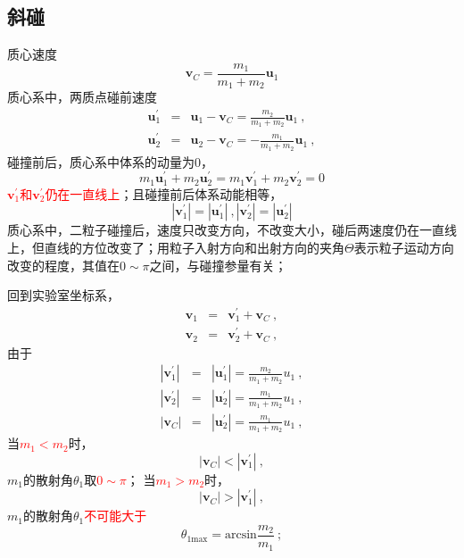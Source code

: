 \documentclass[11pt,a4paper]{article}
\renewcommand{\vec}[1]{\boldsymbol{#1}}
\begin{document}
\subsection{斜碰}
质心速度
\begin{equation}
\vec{v}_C = \frac{m_1}{m_1 +m_2} \vec{u}_1
\end{equation}
质心系中，两质点碰前速度
\begin{eqnarray}
\nonumber \vec{u}_1^{\prime} &=& \vec{u}_1 -\vec{v}_C = \frac{m_2}{m_1+m_2} \vec{u}_1 ~, \\
 \vec{u}_2^{\prime} &=& \vec{u}_2 -\vec{v}_C = -\frac{m_1}{m_1+m_2} \vec{u}_1 ~,
\end{eqnarray}
碰撞前后，质心系中体系的动量为$0$，
\begin{equation}
m_1 \vec{u}_1^{\prime} + m_2 \vec{u}_2^{\prime} = m_1 \vec{v}_1^{\prime} + m_2 \vec{v}_2^{\prime} = 0
\end{equation}
\textcolor{red}{$\vec{v}_1^{\prime}$和$\vec{v}_2^{\prime}$仍在一直线上}；且碰撞前后体系动能相等，
\begin{equation}
|\vec{v}^{\prime}_1| = |\vec{u}^{\prime}_1| ~, |\vec{v}^{\prime}_2| = |\vec{u}^{\prime}_2|
\end{equation}
质心系中，二粒子碰撞后，速度只改变方向，不改变大小，碰后两速度仍在一直线上，但直线的方位改变了；用粒子入射方向和出射方向的夹角$\Theta$表示粒子运动方向改变的程度，其值在$0 \sim \pi$之间，与碰撞参量有关；

回到实验室坐标系，
\begin{eqnarray}
\nonumber \vec{v}_1 &=& \vec{v}_1^{\prime}  +\vec{v}_C  ~, \\
\vec{v}_2 &=& \vec{v}_2^{\prime}  +\vec{v}_C  ~, 
\end{eqnarray}
由于
\begin{eqnarray}
\nonumber |\vec{v}^{\prime}_1| &=& |\vec{u}^{\prime}_1| = \frac{m_2}{m_1 +m_2}u_1 ~, \\ 
\nonumber |\vec{v}^{\prime}_2| &=& |\vec{u}^{\prime}_2| = \frac{m_1}{m_1+m_2} u_1 ~, \\
 |\vec{v}_C| &=& |\vec{u}^{\prime}_2| = \frac{m_1}{m_1+m_2} u_1 ~, 
\end{eqnarray}
当\textcolor{red}{$m_1 < m_2$}时，
\begin{equation}
|\vec{v}_C| < |\vec{v}_1^{\prime}| ~,
\end{equation}
$m_1$的散射角$\theta_1$取\textcolor{red}{$0 \sim \pi$}；
当\textcolor{red}{$m_1 > m_2$}时，
\begin{equation}
|\vec{v}_C| > |\vec{v}_1^{\prime}| ~,
\end{equation}
$m_1$的散射角$\theta_1$\textcolor{red}{不可能大于}
\begin{equation}
\theta_{1 \text{max}} = \text{arcsin} \frac{m_2}{m_1} ~;
\end{equation}
\end{document}
